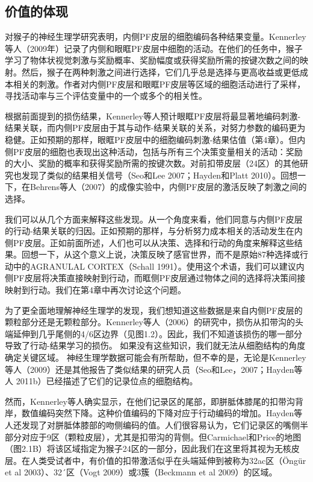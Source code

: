 \subsection{价值的体现}
对猴子的神经生理学研究表明，内侧PF皮层的细胞编码各种结果变量。Kennerley等人（2009年）记录了内侧和眼眶PF皮层中细胞的活动。在他们的任务中，猴子学习了物体状视觉刺激与奖励概率、奖励幅度或获得奖励所需的按键次数之间的映射。然后，猴子在两种刺激之间进行选择，它们几乎总是选择与更高收益或更低成本相关的刺激。作者对内侧PF皮层和眼眶PF皮层等区域的细胞活动进行了采样，寻找活动率与三个评估变量中的一个或多个的相关性。\par
根据前面提到的损伤结果，Kennerley等人预计眼眶PF皮层将最显著地编码刺激-结果关联，而内侧PF皮层由于其与动作-结果关联的关系，对努力参数的编码更为稳健。正如预期的那样，眼眶PF皮层中的细胞编码刺激-结果估值（第4章）。但内侧PF皮层的细胞也表现出这种活动，包括与所有三个决策变量相关的活动：奖励的大小、奖励的概率和获得奖励所需的按键次数。对前扣带皮层（24区）的其他研究也发现了类似的结果相关信号（Seo和Lee 2007；Hayden和Platt 2010）。回想一下，在Behrens等人（2007）的成像实验中，内侧PF皮层的激活反映了刺激之间的选择。\par
我们可以从几个方面来解释这些发现。从一个角度来看，他们同意与内侧PF皮层的行动-结果关联的归因。正如预期的那样，与分析努力成本相关的活动发生在内侧PF皮层。正如前面所述，人们也可以从决策、选择和行动的角度来解释这些结果。回想一下，从这个意义上说，决策反映了感官世界，而不是原始87种选择或行动中的AGRANULAL CORTEX（Schall 1991）。使用这个术语，我们可以建议内侧PF皮层将决策直接映射到行动，而眶侧PF皮层通过物体之间的选择将决策间接映射到行动。我们在第4章中再次讨论这个问题。\par
为了更全面地理解神经生理学的发现，我们想知道这些数据是来自内侧PF皮层的颗粒部分还是无颗粒部分。Kennerley等人（2006）的研究中，损伤从扣带沟的头端延伸到几乎尾侧的4/6区边界（见图1.2）。因此，我们不知道该损伤的哪一部分导致了行动-结果学习的损伤。
如果没有这些知识，我们就无法从细胞结构的角度确定关键区域。
神经生理学数据可能会有所帮助，但不幸的是，无论是Kennerley等人（2009）还是其他报告了类似结果的研究人员（Seo和Lee，2007；Hayden等人
2011b）已经描述了它们的记录位点的细胞结构。\par
然而，Kennerley等人确实显示，在他们记录区的尾部，即胼胝体膝尾的扣带沟背岸，数值编码突然下降。这种价值编码的下降对应于行动编码的增加。Hayden等人还发现了对胼胝体膝部的吻侧编码的值。人们很容易认为，它们记录区的嘴侧半部分对应于9区（颗粒皮层），尤其是扣带沟的背侧。但Carmichael和Price的地图（图2.1B）将该区域指定为猴子24区的一部分，因此我们在这里将其视为无核皮层。在人类受试者中，有价值的扣带激活似乎在头端延伸到被称为32ac区（Öngür et al 2003）、32´区（Vogt 2009）或3簇（Beckmann et al 2009）的区域。\par
